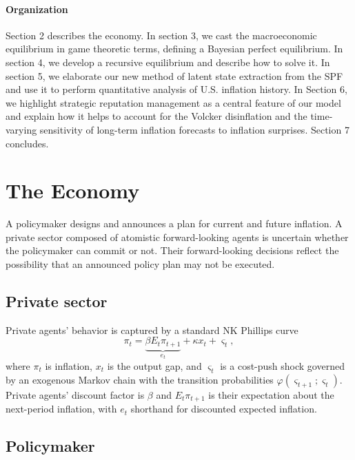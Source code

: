 \documentclass[12pt,letter,leqno]{article}
\theoremstyle{asn}
\theoremstyle{lem}
\theoremstyle{slem}
\theoremstyle{prop}
\theoremstyle{appprop}
\theoremstyle{rem}
\theoremstyle{defn}
\begin{document}
\paragraph{Organization} Section 2 describes the economy. In section 3, we cast the macroeconomic equilibrium in game theoretic terms, defining a Bayesian perfect equilibrium. In section 4, we develop a recursive equilibrium and describe how to solve it. In section 5, we elaborate our new method of latent state extraction from the SPF and use it to perform quantitative analysis of U.S. inflation history. In Section 6, we highlight strategic reputation management as a central feature of our model and explain how it helps to account for the Volcker disinflation and the time-varying sensitivity of long-term inflation forecasts to inflation surprises. Section 7 concludes. 

\section{The Economy}

A policymaker designs and announces a plan for
current and future inflation. A private sector composed of atomistic forward-looking agents is uncertain whether the policymaker can commit or not. Their forward-looking decisions reflect the
possibility that an announced policy plan may not be executed.
\subsection{Private sector}

Private agents' behavior is captured by a standard NK Phillips curve 
\begin{equation}
\pi _{t}=\underset{e_{t}}{\underbrace{\beta E_{t}\pi _{t+1}}}+\kappa
x_{t}+\varsigma _{t},  \label{PC}
\end{equation}%
where $\pi_t$ is inflation, $x_t$ is the output gap, and $\varsigma _{t}$
is a cost-push shock governed by an exogenous Markov chain with the
transition probabilities $\varphi \left( \varsigma _{t+1};\varsigma
_{t}\right).$ Private agents' discount factor is $\beta$ and $E_{t}\pi _{t+1}$
is their expectation about the next-period inflation, with $e_{t}$ shorthand for discounted expected inflation. 
%

\subsection{Policymaker}
\end{document}
